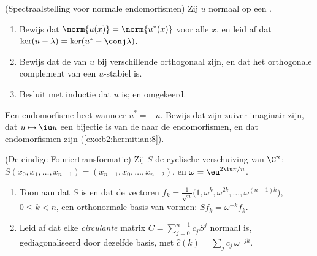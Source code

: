 \begin{exercise}[$\star\star\star$]\label{exo:b2:hermitian:8}
(Spectraalstelling voor normale endomorfismen) Zij $u$ normaal op
een .
\begin{enumerate}
  \item Bewijs dat $\norm{u(x)} = \norm{u^*(x)}$ voor alle $x$, en
        leid af dat $\ker(u - \lambda) = \ker(u^* -
        \conj\lambda)$.
  \item Bewijs dat de  van $u$ bij verschillende
         orthogonaal zijn, en dat het orthogonale
        complement van een  $u$-stabiel is.
  \item Besluit met inductie dat $u$   is;
        en omgekeerd.
\end{enumerate}
\end{exercise}

\begin{exercise}[$\star$]\label{exo:b2:hermitian:9}
Een endomorfisme heet \emph{} wanneer $u^* = -u$.
Bewijs dat zijn  zuiver imaginair zijn, dat $u \mapsto
\iu u$ een bijectie is van de  naar de 
endomorfismen, en dat  endomorfismen 
 zijn (\cref{exo:b2:hermitian:8}).
\end{exercise}

\begin{exercise}[$\star\star$]\label{exo:b2:hermitian:10}
(De eindige Fouriertransformatie) Zij $S$ de cyclische
verschuiving van $\C^n$: $S(x_0, x_1, \dots, x_{n-1}) = (x_{n-1},
x_0, \dots, x_{n-2})$, en $\omega = \eu^{2\iu\pi/n}$.
\begin{enumerate}
  \item Toon aan dat $S$  is en dat de vectoren $f_k =
        \frac{1}{\sqrt n}\bigl(1, \omega^k, \omega^{2k}, \dots,
        \omega^{(n-1)k}\bigr)$, $0 \leq k < n$, een orthonormale
        basis van  vormen: $Sf_k = \omega^{-k}
        f_k$.
  \item Leid af dat elke \emph{circulante} matrix $C =
        \sum_{j=0}^{n-1} c_jS^j$ normaal is, gediagonaliseerd
        door dezelfde basis, met  $\widehat c(k) =
        \sum_j c_j\,\omega^{-jk}$.
\end{enumerate}
\end{exercise}

